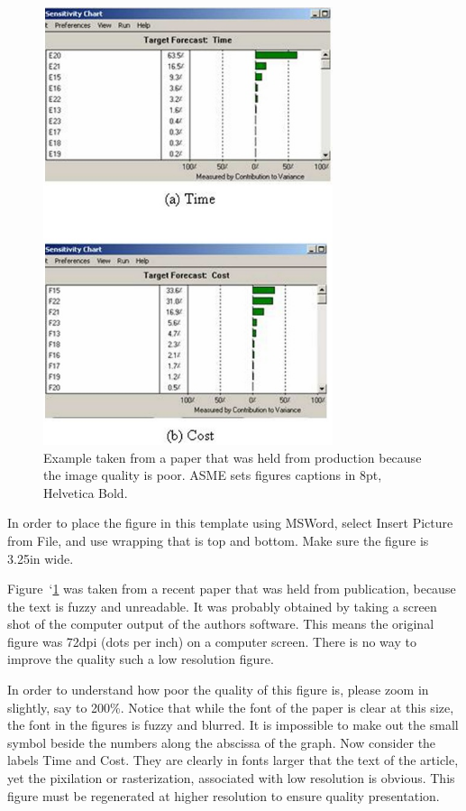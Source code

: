 \documentclass[twocolumn,10pt]{asme2ej}
\begin{document}
\begin{figure} 
\centerline{\includegraphics[width=3.34in]{figure/FMANU_MD_05_1107_11.jpg}}
\caption{Example taken from a paper that was held from production because the image quality is poor.  ASME sets figures captions in 8pt, Helvetica Bold.}
\label{fig_example1.jpg}
\end{figure}

In order to place the figure in this template using MSWord, select Insert Picture from File, and use wrapping that is top and bottom. Make sure the figure is 3.25in wide.
 
Figure~`\ref{fig_example1.jpg}
was taken from a recent paper that was held from publication, because the text is fuzzy and unreadable. It was probably obtained by taking a screen shot of the computer output of the authors software. This means the original figure was 72dpi (dots per inch) on a computer screen. There is no way to improve the quality such a low resolution figure.
 
In order to understand how poor the quality of this figure is, please zoom in slightly, say to 200\%.  Notice that while the font of the paper is clear at this size, the font in the figures is fuzzy and blurred.  It is impossible to make out the small symbol beside the numbers along the abscissa of the graph.  Now consider the labels Time and Cost. They are clearly in fonts larger that the text of the article, yet the pixilation or rasterization, associated with low resolution is obvious. This figure must be regenerated at higher resolution to ensure quality presentation.
\end{document}
